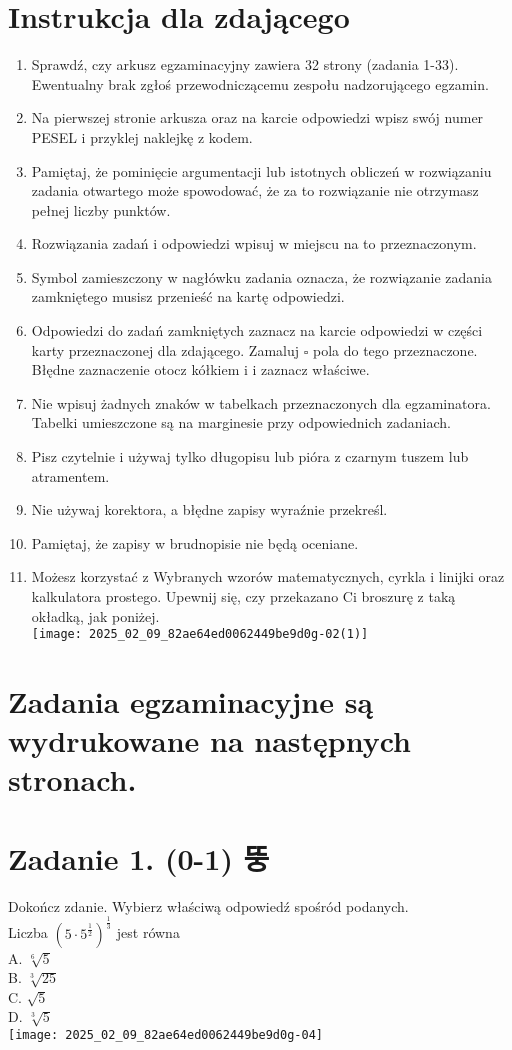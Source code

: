 \documentclass[10pt]{article}
\begin{document}
\section*{Instrukcja dla zdającego}
\begin{enumerate}
  \item Sprawdź, czy arkusz egzaminacyjny zawiera 32 strony (zadania 1-33). Ewentualny brak zgłoś przewodniczącemu zespołu nadzorującego egzamin.
  \item Na pierwszej stronie arkusza oraz na karcie odpowiedzi wpisz swój numer PESEL i przyklej naklejkę z kodem.
  \item Pamiętaj, że pominięcie argumentacji lub istotnych obliczeń w rozwiązaniu zadania otwartego może spowodować, że za to rozwiązanie nie otrzymasz pełnej liczby punktów.
  \item Rozwiązania zadań i odpowiedzi wpisuj w miejscu na to przeznaczonym.
  \item Symbol zamieszczony w nagłówku zadania oznacza, że rozwiązanie zadania zamkniętego musisz przenieść na kartę odpowiedzi.
  \item Odpowiedzi do zadań zamkniętych zaznacz na karcie odpowiedzi w części karty przeznaczonej dla zdającego. Zamaluj \(\square\) pola do tego przeznaczone. Błędne zaznaczenie otocz kółkiem i i zaznacz właściwe.
  \item Nie wpisuj żadnych znaków w tabelkach przeznaczonych dla egzaminatora. Tabelki umieszczone są na marginesie przy odpowiednich zadaniach.
  \item Pisz czytelnie i używaj tylko długopisu lub pióra z czarnym tuszem lub atramentem.
  \item Nie używaj korektora, a błędne zapisy wyraźnie przekreśl.
  \item Pamiętaj, że zapisy w brudnopisie nie będą oceniane.
  \item Możesz korzystać z Wybranych wzorów matematycznych, cyrkla i linijki oraz kalkulatora prostego. Upewnij się, czy przekazano Ci broszurę z taką okładką, jak poniżej.\\
\texttt{[image: 2025\_02\_09\_82ae64ed0062449be9d0g-02(1)]}
\end{enumerate}

\section*{Zadania egzaminacyjne są wydrukowane na następnych stronach.}
\section*{Zadanie 1. (0-1) 뚱}
Dokończ zdanie. Wybierz właściwą odpowiedź spośród podanych.\\
Liczba \(\left(5 \cdot 5^{\frac{1}{2}}\right)^{\frac{1}{3}}\) jest równa\\
A. \(\sqrt[6]{5}\)\\
B. \(\sqrt[3]{25}\)\\
C. \(\sqrt{5}\)\\
D. \(\sqrt[3]{5}\)\\
\texttt{[image: 2025\_02\_09\_82ae64ed0062449be9d0g-04]}
\end{document}
